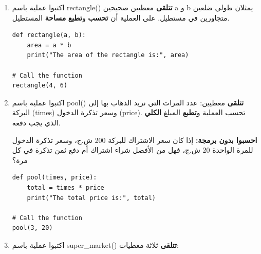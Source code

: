 \documentclass[14pt]{extarticle}
\begin{document}
\begin{enumerate}[resume, label=\textbf{تمرين \arabic*:}, wide=0pt, itemsep=2.2em]

\item اكتبوا عملية باسم \textenglish{rectangle()} \textbf{تتلقى} معطيين صحيحين \textenglish{a} و \textenglish{b} يمثلان طولي ضلعين متجاورين في مستطيل. على العملية أن \textbf{تحسب} و\textbf{تطبع} \textbf{مساحة} المستطيل.

\ifwithsols
\begin{boxSolution}
\begin{english}
\begin{verbatim}
def rectangle(a, b):
    area = a * b
    print("The area of the rectangle is:", area)

# Call the function
rectangle(4, 6)
\end{verbatim}
\end{english}
\end{boxSolution}

\filbreak
\fi

\item اكتبوا عملية باسم \textenglish{pool()} \textbf{تتلقى} معطيين: عدد المرات التي نريد الذهاب بها إلى البركة (\textenglish{times}) وسعر تذكرة الدخول (\textenglish{price}). تحسب العملية و\textbf{تطبع} المبلغ \textbf{الكلي} الذي يجب دفعه.

\textbf{احسبوا بدون برمجة:} إذا كان سعر الاشتراك للبركة 200 ش.ج، وسعر تذكرة الدخول للمرة الواحدة 20 ش.ج، فهل من الأفضل شراء اشتراك أم دفع ثمن تذكرة في كل مرة؟

\ifwithsols
\begin{boxSolution}
\begin{english}
\begin{verbatim}
def pool(times, price):
    total = times * price
    print("The total price is:", total)

# Call the function
pool(3, 20)
\end{verbatim}
\end{english}
\end{boxSolution}

\filbreak
\fi

\item اكتبوا عملية باسم \textenglish{super\_market()} \textbf{تتلقى} ثلاثة معطيات:


\end{enumerate}
\end{document}
